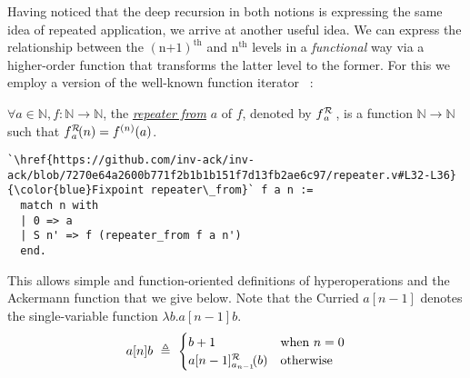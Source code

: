 Having noticed that the deep recursion in both notions is expressing the same idea
of repeated application, we arrive at another useful idea. We can express the relationship
between the $(\text{n+1})^{\text{th}}$ and $\text{n}^{\text{th}}$ levels in
a \emph{functional} way via a higher-order function that transforms the latter level
to the former. For this we employ a version of the well-known function iterator
~\cite{bertotcast}:
\begin{defn}
$\forall a\in \mathbb{N}, f: \mathbb{N}\to \mathbb{N}$, the
\href{https://github.com/inv-ack/inv-ack/blob/7270e64a2600b771f2b1b1b151f7d13fb2ae6c97/repeater.v#L32-L36}{\color{blue}\emph{repeater from}}
$a$ of $f$, denoted by $\rf{f}{a}$ , is a function $\mathbb{N}\to \mathbb{N}$ such that $\rf{f}{a}(n) = f^{(n)}(a)$.
\begin{lstlisting}
`\href{https://github.com/inv-ack/inv-ack/blob/7270e64a2600b771f2b1b1b151f7d13fb2ae6c97/repeater.v#L32-L36}{\color{blue}Fixpoint repeater\_from}` f a n :=
  match n with
  | 0 => a
  | S n' => f (repeater_from f a n') 
  end.
\end{lstlisting}
\end{defn}
\noindent This allows simple and function-oriented definitions of hyperoperations and the
Ackermann function that we give below. Note that the Curried $a[n-1]$ denotes
the single-variable function $\lambda b.a[n-1]b$.
\vspace{-0.5em}
\begin{equation*}
a[n]b ~ \triangleq ~ \begin{cases}
b + 1 & \text{when } n = 0 \\
\rf{a[n-1]}{a_{n-1}}(b) & \text{otherwise}
\end{cases}
\end{equation*}
